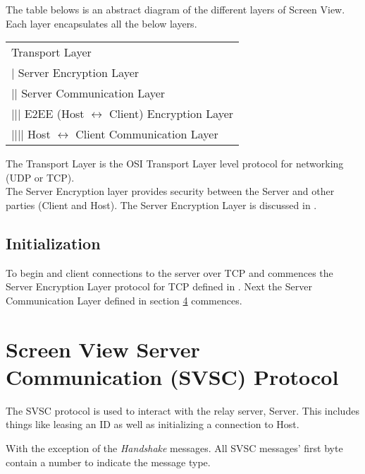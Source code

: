 \documentclass{article}
\newcommand{\projectName}{Screen View}
\begin{document}
    The table belows is an abstract diagram of the different layers of \projectName. Each layer encapsulates all the below layers.

    \begin{center}
        \begin{tabular}{|l|}
            \hline
            Transport Layer                                           \\
            | Server Encryption Layer                                 \\
            || Server Communication Layer                             \\
            ||| E2EE (Host $\leftrightarrow$ Client) Encryption Layer \\
            |||| Host $\leftrightarrow$ Client Communication Layer    \\
            \hline
        \end{tabular}
    \end{center}

    The Transport Layer is the OSI Transport Layer level protocol for networking (UDP or TCP). \\

    The Server Encryption layer provides security between the Server and other parties (Client and Host). The Server Encryption Layer is discussed in %
    .

    \subsection{Initialization}

    To begin and client connections to the server over TCP and commences the Server Encryption Layer protocol for TCP defined in %
    . Next the Server Communication Layer defined in section \hyperlink{section.4}{4} commences.

    \newpage


    \section{Screen View Server Communication (SVSC) Protocol }

    The SVSC protocol is used to interact with the relay server, Server. This includes things like leasing an ID as well as initializing a connection to Host.

    With the exception of the \emph{Handshake} messages. All SVSC messages' first byte contain a number to indicate the message type.
\end{document}
